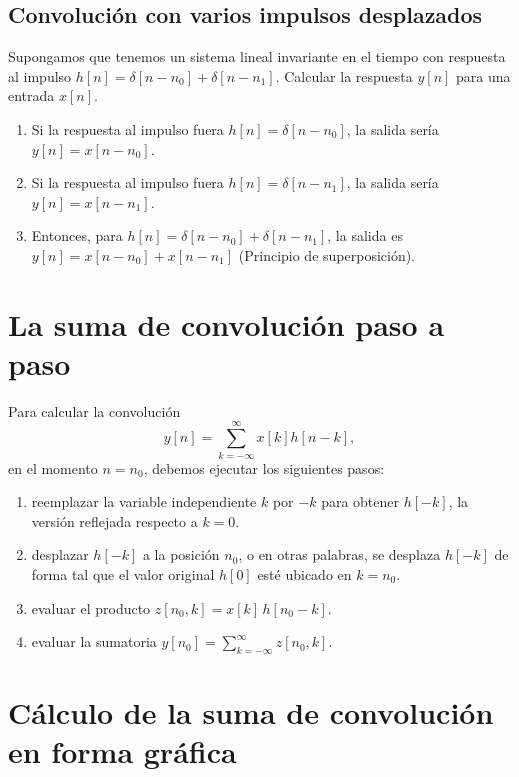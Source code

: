\subsection{Convolución con varios impulsos desplazados}

Supongamos que tenemos un sistema lineal invariante en el tiempo 
con respuesta al impulso $h[n] = \delta[n - n_{0}] + \delta[n - n_{1}]$.
Calcular la respuesta $y[n]$ para una entrada $x[n]$.

\begin{enumerate}
 \item Si la respuesta al impulso fuera $h[n] = \delta[n - n_{0}]$, la salida sería
 $y[n] = x[n - n_{0}]$.
 \item Si la respuesta al impulso fuera $h[n] = \delta[n - n_{1}]$, la salida sería
 $y[n] = x[n - n_{1}]$.
 \item Entonces, para $h[n] = \delta[n - n_{0}] + \delta[n - n_{1}]$, la salida es 
 $y[n] = x[n - n_{0}] + x[n - n_{1}]$ (Principio de superposición).
\end{enumerate}

\section{La suma de convoluci\'{o}n paso a paso}

Para calcular la convoluci\'{o}n 
\begin{equation}
 y[n] = \sum_{k=-\infty}^{\infty} x[k] h[n - k],
\end{equation}
en el momento $n = n_{0}$, debemos ejecutar los siguientes pasos:
\begin{enumerate}
\item reemplazar la variable independiente $k$ por $-k$ para obtener
  $h[-k]$, la  versión reflejada respecto a $k = 0$.
\item desplazar $h[-k]$ a la posici\'{o}n $n_{0}$, o en
  otras palabras, se desplaza $h[-k]$ de forma tal que el valor
  original $h[0]$ esté ubicado en $k = n_{0}$.
\item evaluar el producto $z[n_{0},k] = x[k] \, h[n_{0} - k]$.
\item evaluar la sumatoria $y[n_{0}] = \sum_{k=-\infty}^{\infty} z[n_{0},k]$.
\end{enumerate}

\section{C\'{a}lculo de la suma de convoluci\'{o}n en forma
  gr\'{a}fica}


